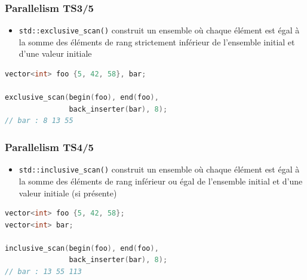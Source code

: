 \documentclass[C++.tex]{subfiles}
\begin{document}
\begin{frame}[fragile]
	\frametitle{Parallelism TS\titlehfill{}3/5}
	\begin{itemize}
		\item \lstinline|std::exclusive_scan()| construit un ensemble où chaque élément est égal à la somme des éléments de rang strictement inférieur de l'ensemble initial et d'une valeur initiale
	\end{itemize}

	\begin{lstlisting}[language=C++]
vector<int> foo {5, 42, 58}, bar;

exclusive_scan(begin(foo), end(foo), 
               back_inserter(bar), 8);
// bar : 8 13 55\end{lstlisting}
\end{frame}

\begin{frame}[fragile]
	\frametitle{Parallelism TS\titlehfill{}4/5}
	\begin{itemize}
		\item \lstinline|std::inclusive_scan()| construit un ensemble où chaque élément est égal à la somme des éléments de rang inférieur ou égal de l'ensemble initial et d'une valeur initiale (si présente)
	\end{itemize}

	\begin{lstlisting}[language=C++]
vector<int> foo {5, 42, 58};
vector<int> bar;

inclusive_scan(begin(foo), end(foo), 
               back_inserter(bar), 8);
// bar : 13 55 113\end{lstlisting}

\end{frame}
\end{document}
